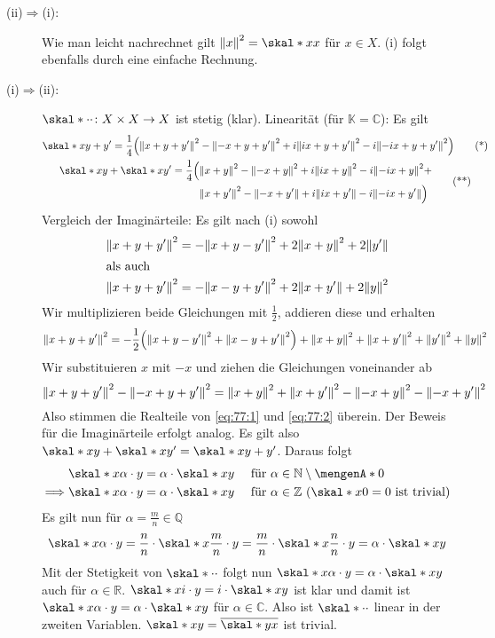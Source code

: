 \begin{description}
	\item[(ii)$\Rightarrow$(i):] Wie man leicht nachrechnet gilt $\norm{x}^2 = \skal*{x}{x}$ für $x \in X$. (i) folgt ebenfalls durch eine einfache Rechnung.
	\item[(i)$\Rightarrow$(ii):] $\skal*{\cdot}{\cdot} \colon X \times X \to X$ ist stetig (klar). Linearität (für $\mathds{K}=\mathds{C}$): Es gilt
	\begin{gather*}
		\skal*{x}{y+y'} = \frac{1}{4} \enbrace*{\norm{x+y+y'}^2 - \norm{-x+y+y'}^2 + i  \norm{i x + y+ y'}^2 - i \norm{- ix +y+y'}^2} \label{eq:77:1}\tag{*} \\ 
		\begin{split}
			\skal*{x}{y} + \skal*{x}{y'} = \frac{1}{4} \Big( &\norm{x+y}^2 - \norm{-x+y}^2 + i  \norm{ix +y}^2 - i  \norm{-ix +y}^2 + \\
			&\norm{x+y'}^2 - \norm{-x+y'} + i  \norm{ix + y'} - i  \norm{-ix +y'} \Big)
		\end{split}
		\label{eq:77:2}\tag{**}
	\end{gather*}
	Vergleich der Imaginärteile: Es gilt nach (i) sowohl
	\begin{align*}
		\norm{x+y+y'}^2 &= - \norm{x+y-y'}^2 + 2 \norm{x+y}^2 + 2 \norm{y'}  \\
		\shortintertext{als auch}
		\norm{x+y+y'}^2 &= - \norm{x-y+y'}^2 + 2 \norm{x+y'} + 2 \norm{y}^2 
	\end{align*}
	Wir multiplizieren beide Gleichungen mit $\frac{1}{2}$, addieren diese und erhalten
	\[
		\norm{x+y+y'}^2= - \frac{1}{2} \enbrace*{\norm{x+y-y'}^2 + \norm{x-y+y'}^2} + \norm{x+y}^2 + \norm{x+y'}^2 + \norm{y'}^2 + \norm{y}^2         
	\]
	Wir substituieren $x$ mit $-x$ und ziehen die Gleichungen voneinander ab
	\[
		\norm{x+y+y'}^2 - \norm{-x+y+y'}^2 = \norm{x+y}^2 + \norm{x+y'}^2 -\norm{-x+y}^2 - \norm{-x+y'}^2
	\]
	Also stimmen die Realteile von \eqref{eq:77:1} und \eqref{eq:77:2} überein. Der Beweis für die Imaginärteile erfolgt analog. Es gilt also
	$\skal*{x}{y} + \skal*{x}{y'}= \skal*{x}{y+y'}$. Daraus folgt
	\begin{align*}
		\skal*{x}{\alpha \cdot y} &= \alpha \cdot \skal*{x}{y} && \text{ für $\alpha \in \mathds{N}\setminus \set{0} $} \\
		\Longrightarrow \skal*{x}{\alpha \cdot y} &= \alpha \cdot \skal*{x}{y} && \text{ für $\alpha \in \mathds{Z}$ ($\skal*{x}{0}=0$ ist trivial)}
	\end{align*}
	Es gilt nun für $\alpha=\frac{m}{n} \in \mathds{Q}$
	\[
		\skal*{x}{\alpha \cdot y} = \frac{n}{n} \cdot \skal*{x}{\frac{m}{n} \cdot y } = \frac{m}{n} \cdot \skal*{x}{\frac{n}{n}\cdot y } = \alpha \cdot \skal*{x}{y}  
	\]
	Mit der Stetigkeit von $\skal*{\cdot}{\cdot}$ folgt nun $\skal*{x}{\alpha \cdot y} = \alpha \cdot \skal*{x}{y}$ auch für $\alpha \in \mathds{R}$.
	$\skal*{x}{i \cdot y} = i \cdot \skal*{x}{y}$ ist klar und damit ist $\skal*{x}{\alpha \cdot y }= \alpha \cdot \skal*{x}{y}$ für $\alpha \in \mathds{C}$. Also ist
	$\skal*{\cdot}{\cdot}$ linear in der zweiten Variablen. $\skal*{x}{y} = \overline{\skal*{y}{x}}$ ist trivial. \bewende
\end{description}

